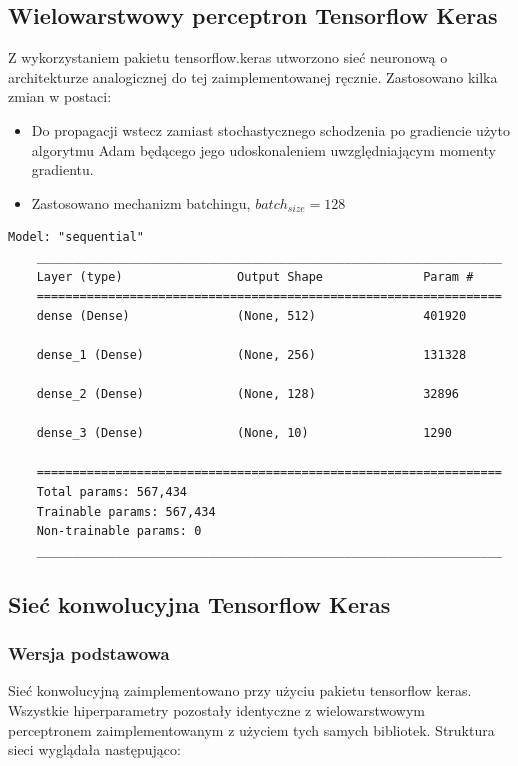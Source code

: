 \documentclass{article}
\begin{document}
\subsection{Wielowarstwowy perceptron Tensorflow Keras}

Z wykorzystaniem pakietu tensorflow.keras utworzono sieć neuronową o architekturze 
analogicznej do tej zaimplementowanej ręcznie. Zastosowano kilka zmian w postaci:

\begin{itemize}
\item Do propagacji wstecz zamiast stochastycznego schodzenia po gradiencie użyto algorytmu 
Adam będącego jego udoskonaleniem uwzględniającym momenty gradientu.
\item Zastosowano mechanizm batchingu, $batch_{size} = 128$
\end{itemize}

\begin{lstlisting}[style=siec]
    Model: "sequential"
    _________________________________________________________________
    Layer (type)                Output Shape              Param #
    =================================================================
    dense (Dense)               (None, 512)               401920

    dense_1 (Dense)             (None, 256)               131328

    dense_2 (Dense)             (None, 128)               32896

    dense_3 (Dense)             (None, 10)                1290
                                                                    
    =================================================================
    Total params: 567,434
    Trainable params: 567,434
    Non-trainable params: 0
    _________________________________________________________________
\end{lstlisting}
\subsection{Sieć konwolucyjna Tensorflow Keras}

\subsubsection{Wersja podstawowa}
Sieć konwolucyjną zaimplementowano przy użyciu pakietu tensorflow keras. Wszystkie hiperparametry pozostały 
identyczne z wielowarstwowym perceptronem zaimplementowanym z użyciem tych samych bibliotek. 
Struktura sieci wyglądała następująco:
\end{document}
